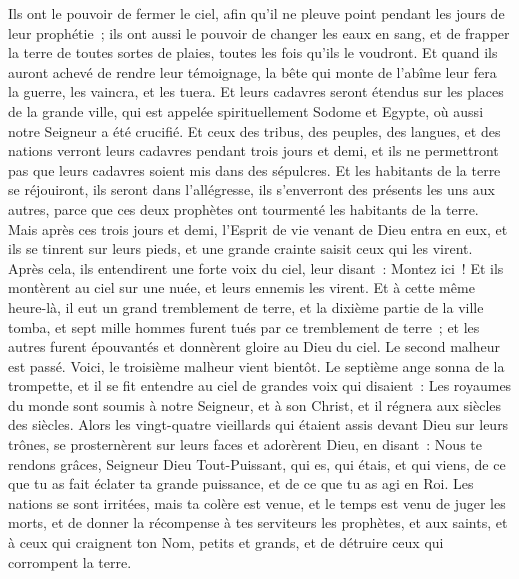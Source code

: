\begin{multicols}{2}
Ils ont le pouvoir de fermer le ciel, afin qu'il ne pleuve point pendant les jours de leur prophétie~; ils ont aussi le pouvoir de changer les eaux en sang, et de frapper la terre de toutes sortes de plaies, toutes les fois qu'ils le voudront.
Et quand ils auront achevé de rendre leur témoignage, la bête qui monte de l'abîme leur fera la guerre, les vaincra, et les tuera.
Et leurs cadavres seront étendus sur les places de la grande ville, qui est appelée spirituellement Sodome et Egypte, où aussi notre Seigneur a été crucifié.
Et ceux des tribus, des peuples, des langues, et des nations verront leurs cadavres pendant trois jours et demi, et ils ne permettront pas que leurs cadavres soient mis dans des sépulcres.
Et les habitants de la terre se réjouiront, ils seront dans l'allégresse, ils s'enverront des présents les uns aux autres, parce que ces deux prophètes ont tourmenté les habitants de la terre.
Mais après ces trois jours et demi, l'Esprit de vie venant de Dieu entra en eux, et ils se tinrent sur leurs pieds, et une grande crainte saisit ceux qui les virent.
Après cela, ils entendirent une forte voix du ciel, leur disant~: Montez ici~! Et ils montèrent au ciel sur une nuée, et leurs ennemis les virent.
Et à cette même heure-là, il eut un grand tremblement de terre, et la dixième partie de la ville tomba, et sept mille hommes furent tués par ce tremblement de terre~; et les autres furent épouvantés et donnèrent gloire au Dieu du ciel.
Le second malheur est passé. Voici, le troisième malheur vient bientôt.
Le septième ange sonna de la trompette, et il se fit entendre au ciel de grandes voix qui disaient~: Les royaumes du monde sont soumis à notre Seigneur, et à son Christ, et il régnera aux siècles des siècles.
Alors les vingt-quatre vieillards qui étaient assis devant Dieu sur leurs trônes, se prosternèrent sur leurs faces et adorèrent Dieu,
en disant~: Nous te rendons grâces, Seigneur Dieu Tout-Puissant, qui es, qui étais, et qui viens, de ce que tu as fait éclater ta grande puissance, et de ce que tu as agi en Roi.
Les nations se sont irritées, mais ta colère est venue, et le temps est venu de juger les morts, et de donner la récompense à tes serviteurs les prophètes, et aux saints, et à ceux qui craignent ton Nom, petits et grands, et de détruire ceux qui corrompent la terre.

\end{multicols}
